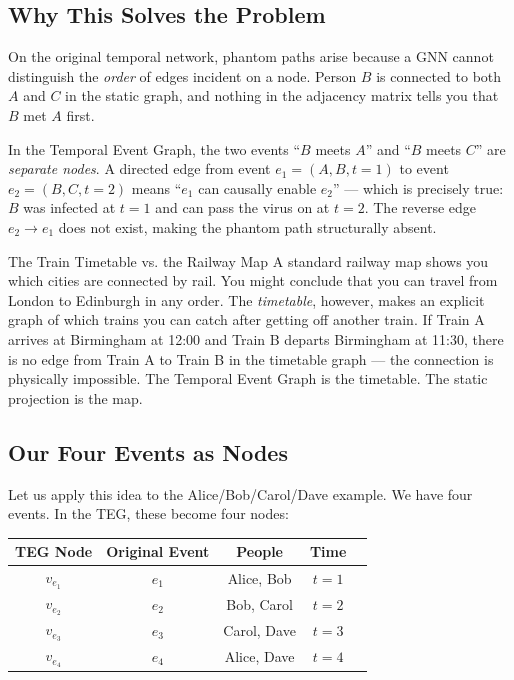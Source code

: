 \subsection{Why This Solves the Problem}

On the original temporal network, phantom paths arise because a GNN cannot
distinguish the \emph{order} of edges incident on a node. Person $B$ is
connected to both $A$ and $C$ in the static graph, and nothing in the adjacency
matrix tells you that $B$ met $A$ first.

In the Temporal Event Graph, the two events ``$B$ meets $A$'' and ``$B$ meets
$C$'' are \emph{separate nodes}. A directed edge from event $e_1=(A,B,t{=}1)$
to event $e_2=(B,C,t{=}2)$ means ``$e_1$ can causally enable $e_2$'' --- which
is precisely true: $B$ was infected at $t=1$ and can pass the virus on at
$t=2$. The reverse edge $e_2 \to e_1$ does not exist, making the phantom path
structurally absent.

\begin{analogybox}{The Train Timetable vs. the Railway Map}
A standard railway map shows you which cities are connected by rail. You might
conclude that you can travel from London to Edinburgh in any order. The
\emph{timetable}, however, makes an explicit graph of which trains you can
catch after getting off another train. If Train A arrives at Birmingham at
12:00 and Train B departs Birmingham at 11:30, there is no edge from Train A
to Train B in the timetable graph --- the connection is physically impossible.
The Temporal Event Graph is the timetable. The static projection is the map.
\end{analogybox}

\subsection{Our Four Events as Nodes}

Let us apply this idea to the Alice/Bob/Carol/Dave example. We have four
events. In the TEG, these become four nodes:

\begin{center}
\begin{tabular}{ccccc}
\toprule
\textbf{TEG Node} & \textbf{Original Event} & \textbf{People} & \textbf{Time} \\
\midrule
$v_{e_1}$ & $e_1$ & Alice, Bob   & $t=1$ \\
$v_{e_2}$ & $e_2$ & Bob, Carol   & $t=2$ \\
$v_{e_3}$ & $e_3$ & Carol, Dave  & $t=3$ \\
$v_{e_4}$ & $e_4$ & Alice, Dave  & $t=4$ \\
\bottomrule
\end{tabular}
\end{center}

